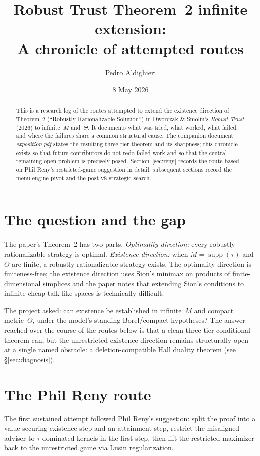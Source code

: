 \documentclass[11pt]{article}
\title{
  Robust Trust Theorem~2 infinite extension:\\
  \large A chronicle of attempted routes
}
\author{Pedro Aldighieri}
\date{8 May 2026}
\theoremstyle{definition}
\theoremstyle{remark}
\newcommand{\Th}{\Theta}
\newcommand{\suppset}{\operatorname{supp}}
\begin{document}
\maketitle

\begin{abstract}
This is a research log of the routes attempted to extend the
existence direction of Theorem~2 (``Robustly Rationalizable
Solution'') in Dworczak \& Smolin's \emph{Robust Trust} (2026) to
infinite~$M$ and~$\Th$. It documents what was tried, what worked,
what failed, and where the failures share a common structural cause.
The companion document \emph{exposition.pdf} states the resulting
three-tier theorem and its sharpness; this chronicle exists so that
future contributors do not redo failed work and so that the central
remaining open problem is precisely posed. Section~\ref{sec:reny}
records the route based on Phil Reny's restricted-game suggestion in
detail; subsequent sections record the menu-engine pivot and the
post-v8 strategic search.
\end{abstract}

\section{The question and the gap}\label{sec:gap}

The paper's Theorem~2 has two parts. \emph{Optimality direction:} every
robustly rationalizable strategy is optimal. \emph{Existence direction:}
when $M = \suppset(\tau)$ and $\Th$ are finite, a robustly
rationalizable strategy exists. The optimality direction is
finiteness-free; the existence direction uses Sion's minimax on
products of finite-dimensional simplices and the paper notes that
extending Sion's conditions to infinite cheap-talk-like spaces is
technically difficult.

The project asked: can existence be established in infinite~$M$ and
compact metric~$\Th$, under the model's standing Borel/compact
hypotheses? The answer reached over the course of the routes below
is that a clean three-tier conditional theorem can, but the
unrestricted existence direction remains structurally open at a
single named obstacle: a deletion-compatible Hall duality theorem
(see \S\ref{sec:diagnosis}).

\section{The Phil Reny route}\label{sec:reny}

The first sustained attempt followed Phil Reny's suggestion: split
the proof into a value-securing existence step and an attainment
step, restrict the misaligned adviser to $\tau$-dominated kernels in
the first step, then lift the restricted maximizer back to the
unrestricted game via Lusin regularization.
\end{document}
